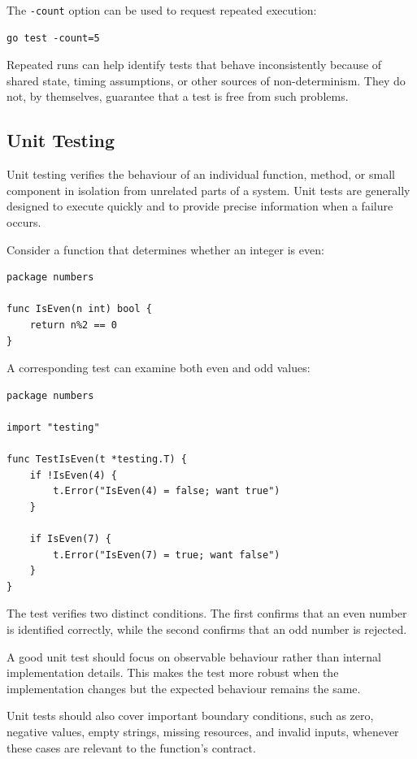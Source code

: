 The \texttt{-count} option can be used to request repeated execution:

\begin{lstlisting}
go test -count=5
\end{lstlisting}

Repeated runs can help identify tests that behave inconsistently because of shared state, timing assumptions, or other sources of non-determinism. They do not, by themselves, guarantee that a test is free from such problems.

\subsection{Unit Testing}

Unit testing verifies the behaviour of an individual function, method, or small component in isolation from unrelated parts of a system. Unit tests are generally designed to execute quickly and to provide precise information when a failure occurs.

Consider a function that determines whether an integer is even:

\begin{lstlisting}
package numbers

func IsEven(n int) bool {
    return n%2 == 0
}
\end{lstlisting}

A corresponding test can examine both even and odd values:

\begin{lstlisting}
package numbers

import "testing"

func TestIsEven(t *testing.T) {
    if !IsEven(4) {
        t.Error("IsEven(4) = false; want true")
    }

    if IsEven(7) {
        t.Error("IsEven(7) = true; want false")
    }
}
\end{lstlisting}

The test verifies two distinct conditions. The first confirms that an even number is identified correctly, while the second confirms that an odd number is rejected.

A good unit test should focus on observable behaviour rather than internal implementation details. This makes the test more robust when the implementation changes but the expected behaviour remains the same.

Unit tests should also cover important boundary conditions, such as zero, negative values, empty strings, missing resources, and invalid inputs, whenever these cases are relevant to the function's contract.

